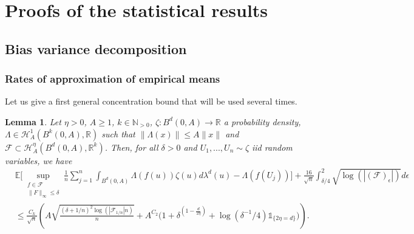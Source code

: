 \documentclass[10pt]{article}
\newtheorem{lemma}{Lemma}
\begin{document}
\section{Proofs of the statistical results}
\subsection{Bias variance decomposition}
\subsubsection{Rates of approximation of empirical means}
Let us give a first general concentration bound that will be used several times.
\begin{lemma}\label{lemma:keyboundclass}
 Let $\eta>0$, $A\geq 1$, $k\in \mathbb{N}_{>0}$,  $\zeta:B^d(0,A)\rightarrow \mathbb{R}$ a probability density, $\Lambda\in \mathcal{H}^1_A(B^k(0,A),\mathbb{R})$ such that $\|\Lambda(x)\|\leq A \|x\|$  and $\mathcal{F}\subset \mathcal{H}^\eta_A(B^d(0,A),\mathbb{R}^k)$. Then, for all $\delta>0$ and $U_1,...,U_n\sim \zeta$ iid random variables, we have
 \begin{align*}
    &\mathbb{E}\Big[\sup \limits_{\substack{f\in \mathcal{F} \\ \|F\|_\infty\leq \delta}}  \frac{1}{n}\sum_{j=1}^n  \int_{B^d(0,A)} \Lambda(f(u))\zeta(u) d\lambda^d(u)-\Lambda(f(U_j))\Big]+\frac{16}{\sqrt{n}}\int_{\delta/4}^{2}\sqrt{\log(|(\mathcal{F})_\epsilon|)}d\epsilon\\
 &\leq \frac{C_k}{\sqrt{n}}\left(A\sqrt{\frac{(\delta+1/n)^2\log(|\mathcal{F}_{1/n}|n)}{n} }
  +A^{C_2}\big(1+\delta^{(1-\frac{d}{2\eta})}+\log(\delta^{-1}/4)\mathds{1}_{\{2\eta= d\}}\big)\right).\end{align*}
\end{lemma}
\end{document}
